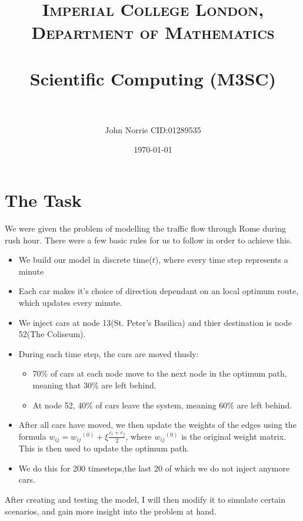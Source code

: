 \documentclass[paper=a4, fontsize=12pt]{scrartcl} %
\title{
\normalfont \normalsize
\textsc{Imperial College London, Department of Mathematics} \\ [25pt]
\horrule{0.5pt} \\[0.4cm]                      %
\huge Scientific Computing (M3SC) \\           %
\horrule{2pt} \\[0.5cm]                        %
}
\author{John Norrie CID:01289535}
\date{\normalsize\today}
\numberwithin{equation}{section}       %
\numberwithin{figure}{section}         %
\numberwithin{table}{section}          %
\begin{document}

\maketitle

\section{The Task}

We were given the problem of modelling the traffic flow through Rome during rush hour. There were a few basic rules for us to follow in order to achieve this.
\begin{itemize}
	\item We build our model in discrete time($t$), where every time step represents a minute 
	\item Each car makes it's choice of direction dependant on an local optimum route, which updates every minute.
	\item We inject cars at node 13(St. Peter's Basilica) and thier destination is node 52(The Coliseum).
	\item During each time step, the cars are moved thusly:
		\begin{itemize}
			\item 70\% of cars at each node move to the next node in the optimum path, meaning that 30\% are left behind.
			\item At node 52, 40\% of cars leave the system, meaning 60\% are left behind.
		\end{itemize}
	\item After all cars have moved, we then update the weights of the edges using the formula $w_{ij}={w_{ij}}^{(0)}+\xi \frac{c_i +c_j}{2}$, where ${w_{ij}}^{(0)}$ is the original weight matrix. This is then used to update the optimum path.
	\item We do this for 200 timesteps,the last 20 of which we do not inject anymore cars.
\end{itemize}
After creating and testing the model, I will then modify it to simulate certain scenarios, and gain more insight into the problem at hand.  
\end{document}

